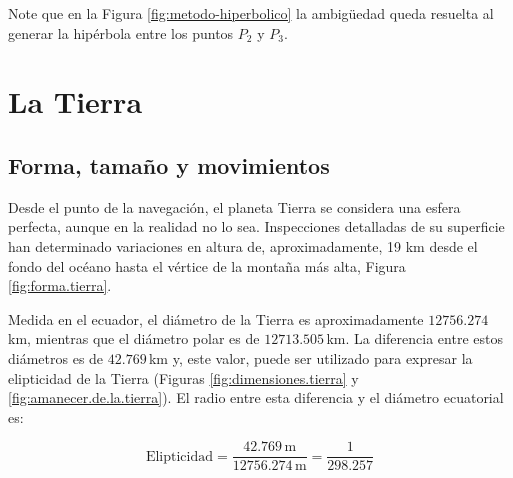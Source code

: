 Note que en la Figura  \ref{fig:metodo-hiperbolico} la ambigüedad queda resuelta al generar la hip\'erbola entre los puntos $P_2$ y $P_3$. 


\section{La Tierra}
\label{sec:la.tierra}

\subsection{Forma, tama\~no y movimientos}
\label{sec:forma.y.tamanio}

Desde el punto de la navegaci\'on, el planeta Tierra se considera una esfera perfecta, aunque en la realidad no lo sea. Inspecciones detalladas de su superficie han determinado variaciones en altura de, aproximadamente, 19 km desde el fondo del oc\'eano hasta el v\'ertice de la monta\~na m\'as alta, Figura \ref{fig:forma.tierra}.

Medida en el ecuador, el di\'ametro de la Tierra es aproximadamente $12756.274$\,km, mientras que el di\'ametro polar es de $12713.505$\,km. La diferencia entre estos di\'ametros es de $42.769$\,km y, este valor, puede ser utilizado para expresar la elipticidad de la Tierra (Figuras \ref{fig:dimensiones.tierra} y \ref{fig:amanecer.de.la.tierra}). El radio entre esta diferencia y el di\'ametro ecuatorial es:

\[\displaystyle
	\text{Elipticidad} = \frac{42.769 \,\text{m}}{ 12756.274\,\text{m}}
	=\frac{1}{298.257}
\]

